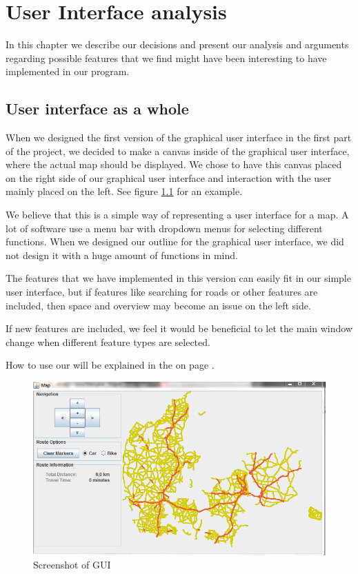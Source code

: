 \chapter{User Interface analysis}
\label{UIA}
In this chapter we describe our decisions and present our analysis and
arguments regarding possible features that we find might have been interesting
to have implemented in our  program.

\section{User interface as a whole}
\label{UIA-UIW}
When we designed the first version of the graphical user interface in the first
part of the project, we decided to make a canvas inside of the graphical user
interface, where the actual map should be displayed. We chose to have this
canvas placed on the right side of our graphical user interface and interaction
with the user mainly placed on the left. See figure \ref{UIA-UIW-PIC} for an
example.

We believe that this is a simple way of representing a user interface for a map.
A lot of software use a menu bar with dropdown menus for selecting different
functions. When we designed our outline for the graphical user interface, we did
not design it with a huge amount of functions in mind. 

The features that we have implemented in this version can easily fit in our
simple user interface, but if features like searching for roads or other
features are included, then space and overview may become an issue on the left side.

If new features are included, we feel it would be beneficial to let the main
window change when different feature types are selected.

How to use our will be explained in the  on page
\pageref{MAN}.

\begin{figure}[!ht]
\centering
\includegraphics[width=1\linewidth]{images/PictureOfUI}
\caption{Screenshot of GUI}
\label{UIA-UIW-PIC}
\end{figure}

